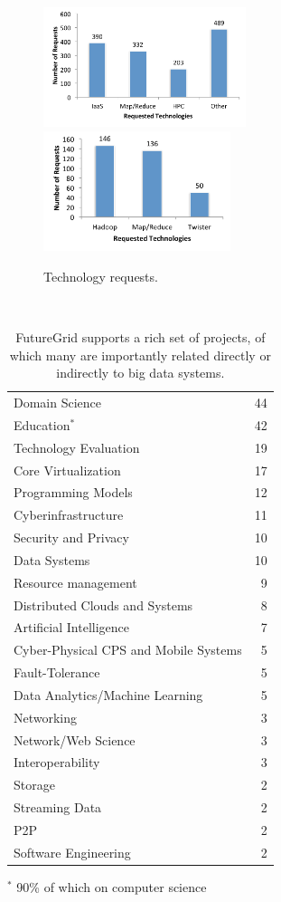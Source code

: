\documentclass[graybox]{svmult}
\begin{document}
\begin{figure}[htb]
  \centering
    \includegraphics[height=3.5cm]{images/tech-trend-1.pdf}\includegraphics[height=3.5cm]{images/tech-trend-2.pdf}
  \caption{Technology requests.}
\label{F:network}
\end{figure}



\begin{table}[htb]
\caption{FutureGrid supports a rich set of projects, of which many are importantly related directly or indirectly to big data systems.}\label{T:diversity}
~\
\begin{center}
\begin{tabular}{lr}
Domain Science & 44 \\
Education$^{*}$ & 42\\
Technology Evaluation & 19 \\
Core Virtualization & 17 \\
Programming Models & 12 \\
Cyberinfrastructure & 11 \\ 
Security and Privacy & 10 \\
Data Systems & 10 \\
Resource management & 9 \\
Distributed Clouds and Systems & 8 \\
Artificial Intelligence & 7 \\
Cyber-Physical CPS and Mobile Systems & 5 \\
Fault-Tolerance & 5 \\
Data Analytics/Machine Learning & 5 \\
Networking & 3 \\
Network/Web Science & 3 \\
Interoperability & 3 \\
Storage & 2 \\
Streaming Data & 2 \\
P2P & 2 \\
Software Engineering & 2 \\
\end{tabular}
\end{center}

$^{*}$ 90\% of which on computer science
\end{table}
\end{document}
